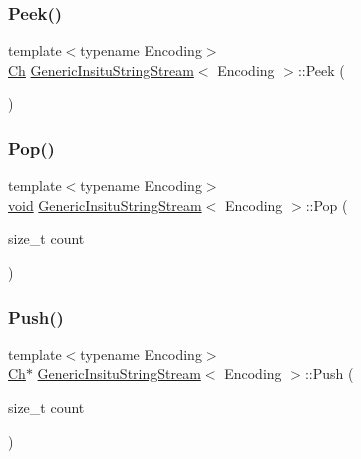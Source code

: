 \mbox{\label{structGenericInsituStringStream_ae21ba3ff4595ccd5caa4a9858e793f3f}} 
\subsubsection{\texorpdfstring{Peek()}{Peek()}}
{\footnotesize\ttfamily template$<$typename Encoding$>$ \\
\hyperlink{structGenericInsituStringStream_a277308a58f551f11d0d9a20823702b5a}{Ch} \hyperlink{structGenericInsituStringStream}{Generic\+Insitu\+String\+Stream}$<$ Encoding $>$\+::Peek (\begin{DoxyParamCaption}{ }\end{DoxyParamCaption})\hspace{0.3cm}{\ttfamily [inline]}}

\mbox{\label{structGenericInsituStringStream_ad2c56d9dd64268ad72aab95f981fd761}} 
\subsubsection{\texorpdfstring{Pop()}{Pop()}}
{\footnotesize\ttfamily template$<$typename Encoding$>$ \\
\hyperlink{imgui__impl__opengl3__loader_8h_ac668e7cffd9e2e9cfee428b9b2f34fa7}{void} \hyperlink{structGenericInsituStringStream}{Generic\+Insitu\+String\+Stream}$<$ Encoding $>$\+::Pop (\begin{DoxyParamCaption}\item[{size\+\_\+t}]{count }\end{DoxyParamCaption})\hspace{0.3cm}{\ttfamily [inline]}}

\mbox{\label{structGenericInsituStringStream_af91a643e5a93292bc0fbda33320caf20}} 
\subsubsection{\texorpdfstring{Push()}{Push()}}
{\footnotesize\ttfamily template$<$typename Encoding$>$ \\
\hyperlink{structGenericInsituStringStream_a277308a58f551f11d0d9a20823702b5a}{Ch}$\ast$ \hyperlink{structGenericInsituStringStream}{Generic\+Insitu\+String\+Stream}$<$ Encoding $>$\+::Push (\begin{DoxyParamCaption}\item[{size\+\_\+t}]{count }\end{DoxyParamCaption})\hspace{0.3cm}{\ttfamily [inline]}}

